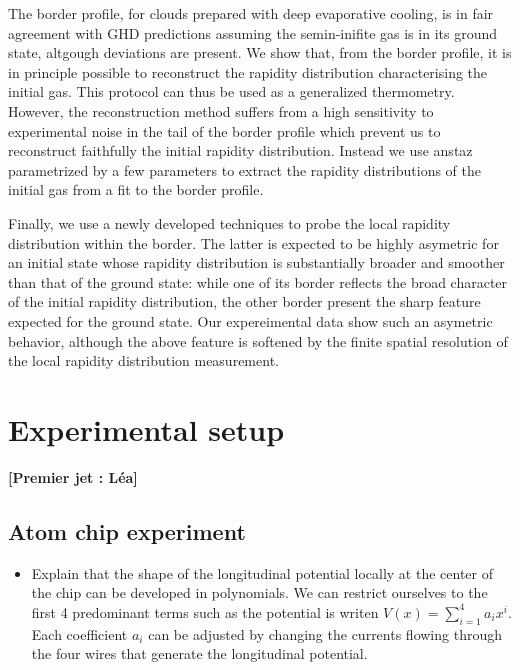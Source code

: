 \documentclass[submission, Phys]{SciPost}
\begin{document}
The border profile, for clouds prepared with deep evaporative cooling, is in fair agreement with GHD predictions assuming the semin-inifite gas is in its ground state, altgough deviations are present. We show that, from the border profile, it is in principle possible to reconstruct the rapidity distribution characterising the initial gas. This protocol can thus be used as a generalized thermometry. 
However, the reconstruction method suffers from a high sensitivity to experimental noise in the tail of the border profile which prevent us to reconstruct faithfully the initial rapidity distribution. Instead we use anstaz parametrized by a few parameters to extract the rapidity distributions of the initial gas from a fit to the border profile. 

Finally, we use a newly developed techniques\cite{dubois_probing_2024} to probe the local rapidity distribution within the border. The latter is expected to be highly asymetric for an initial state whose rapidity distribution is substantially broader and 
smoother than that of the ground state:  while one of its border 
reflects the broad character of the initial rapidity distribution, the other border 
present the sharp feature expected for the ground state.  Our expereimental data show such an asymetric behavior, although the above feature is softened by the finite spatial resolution of the local rapidity distribution measurement.  


\section{Experimental setup}
{\bf [Premier jet : Léa]}
\subsection{Atom chip experiment}
\begin{itemize}
    \item Explain that the shape of the longitudinal potential locally at the center of the chip can be developed in polynomials. We can restrict ourselves to the first 4 predominant terms such as the potential is writen $V(x) = \sum_{i=1}^{4} a_i x^i$. Each coefficient $a_i$ can be adjusted by changing the currents flowing through the four wires that generate the longitudinal potential.
\end{itemize}
\end{document}
